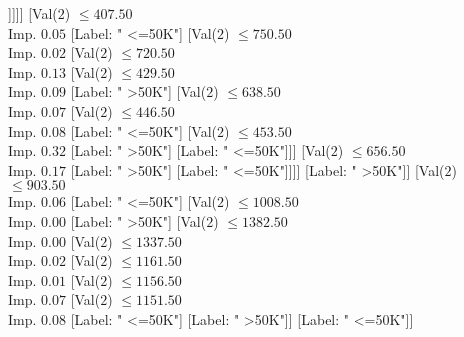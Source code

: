 \documentclass[margin=10pt]{standalone}
\begin{document}
\begin{forest}
																									[Label: " >50K"]
																									[Val($2$) $ \leq 155.50$ \\ Imp. $0.09$
																										[Label: " <=50K"]
																										[Val($2$) $ \leq 172.50$ \\ Imp. $0.01$
																											[Label: " >50K"]
																											[Label: " <=50K"]]]]]
																							[Val($2$) $ \leq 407.50$ \\ Imp. $0.05$
																								[Label: " <=50K"]
																								[Val($2$) $ \leq 750.50$ \\ Imp. $0.02$
																									[Val($2$) $ \leq 720.50$ \\ Imp. $0.13$
																										[Val($2$) $ \leq 429.50$ \\ Imp. $0.09$
																											[Label: " >50K"]
																											[Val($2$) $ \leq 638.50$ \\ Imp. $0.07$
																												[Val($2$) $ \leq 446.50$ \\ Imp. $0.08$
																													[Label: " <=50K"]
																													[Val($2$) $ \leq 453.50$ \\ Imp. $0.32$
																														[Label: " >50K"]
																														[Label: " <=50K"]]]
																												[Val($2$) $ \leq 656.50$ \\ Imp. $0.17$
																													[Label: " >50K"]
																													[Label: " <=50K"]]]]
																										[Label: " >50K"]]
																									[Val($2$) $ \leq 903.50$ \\ Imp. $0.06$
																										[Label: " <=50K"]
																										[Val($2$) $ \leq 1008.50$ \\ Imp. $0.00$
																											[Label: " >50K"]
																											[Val($2$) $ \leq 1382.50$ \\ Imp. $0.00$
																												[Val($2$) $ \leq 1337.50$ \\ Imp. $0.02$
																													[Val($2$) $ \leq 1161.50$ \\ Imp. $0.01$
																														[Val($2$) $ \leq 1156.50$ \\ Imp. $0.07$
																															[Val($2$) $ \leq 1151.50$ \\ Imp. $0.08$
																																[Label: " <=50K"]
																																[Label: " >50K"]]
																															[Label: " <=50K"]]

\end{forest}
\end{document}
